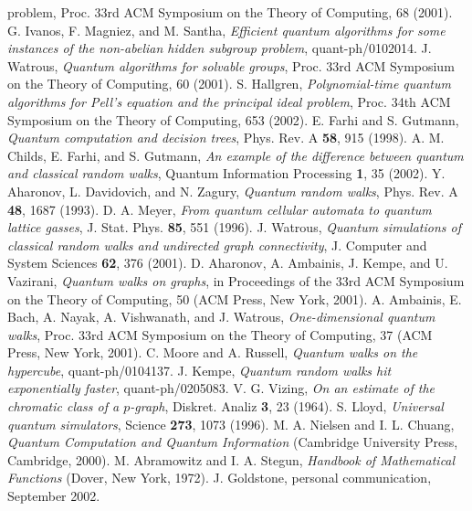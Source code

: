 \documentclass{beamer}
\newcommand{\<}{\langle}
\renewcommand{\>}{\rangle}
\newcommand{\qph}[1]{quant-ph/#1}
\begin{document}
\begin{frame}[allowframebreaks]
\begin{thebibliography}{}
{          problem},
          Proc. 33rd ACM Symposium on the Theory of Computing,
          68 (2001).
          G. Ivanos, F. Magniez, and M. Santha,
          {\em Efficient quantum algorithms for some instances of the non-abelian
          hidden subgroup problem},
          \qph{0102014}.
          J. Watrous,
          {\em Quantum algorithms for solvable groups},
          Proc. 33rd ACM Symposium on the Theory of Computing, 60 (2001).
          S. Hallgren,
          {\em Polynomial-time quantum algorithms for Pell's equation and the
          principal ideal problem},
          Proc. 34th ACM Symposium on the Theory of Computing, 653 (2002).
          E. Farhi and S. Gutmann,
          {\em Quantum computation and decision trees},
          Phys. Rev. A {\bf 58}, 915 (1998).
          A. M. Childs, E. Farhi, and S. Gutmann,
          {\em An example of the difference between quantum and classical random
          walks},
          Quantum Information Processing {\bf 1}, 35 (2002).
          Y. Aharonov, L. Davidovich, and N. Zagury,
          {\em Quantum random walks},
          Phys. Rev. A {\bf 48}, 1687 (1993).
          D. A. Meyer, 
          {\em From quantum cellular automata to quantum lattice gasses}, 
          J. Stat. Phys. {\bf 85}, 551 (1996).
          J. Watrous, 
          {\em Quantum simulations of classical random walks and undirected 
          graph connectivity},
          J. Computer and System Sciences {\bf 62}, 376 (2001).
          D. Aharonov, A. Ambainis, J. Kempe, and U. Vazirani, 
          {\em Quantum walks on graphs}, 
          in Proceedings of the 33rd ACM Symposium on the Theory of Computing, 50
          (ACM Press, New York, 2001).
          A. Ambainis, E. Bach, A. Nayak, A. Vishwanath, and J. Watrous, 
          {\em One-dimensional quantum walks}, 
          Proc. 33rd ACM Symposium on the Theory of Computing, 37 (ACM Press, New
          York, 2001).  
          C. Moore and A. Russell,
          {\em Quantum walks on the hypercube},
          \qph{0104137}.
          J. Kempe,
          {\em Quantum random walks hit exponentially faster},
          \qph{0205083}.
          V. G. Vizing,
          {\em On an estimate of the chromatic class of a $p$-graph}, Diskret.
          Analiz {\bf 3}, 23 (1964).
          S. Lloyd,
          {\em Universal quantum simulators},
          Science {\bf 273}, 1073 (1996).
          M. A. Nielsen and I. L. Chuang,
          {\em Quantum Computation and Quantum Information}
          (Cambridge University Press, Cambridge, 2000).
          M. Abramowitz and I. A. Stegun, 
          {\em Handbook of Mathematical Functions}
          (Dover, New York, 1972).
          J. Goldstone, personal communication, September 2002.
    \end{thebibliography}
\end{frame}
\end{document}
